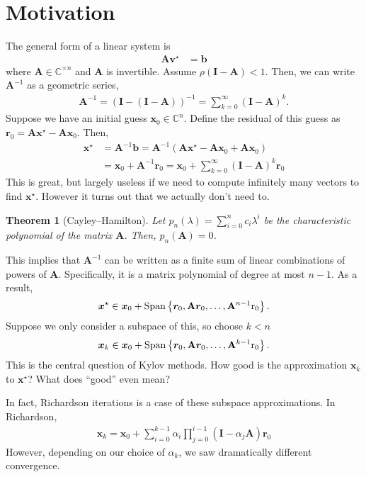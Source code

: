 \documentclass[12pt,a4paper]{article} %
\newtheorem*{theorem}{Theorem}
\DeclareMathOperator{\Span}{Span}
\begin{document}
\section{Motivation}
The general form of a linear system is 
\begin{align*}
    \mathbf A \bm v^\star &= \bm b
\end{align*}
where $\mathbf A \in \mathbb C^{ \times n}$ and $\mathbf A$ is invertible. 
Assume $\rho(\mathbf I - \mathbf A) < 1$. Then, we can write
$\mathbf A^{-1}$ as a geometric series,
\begin{align*}
    \mathbf A^{-1} = (\mathbf I - (\mathbf I - \mathbf A))^{-1} = \sum_{k=0}^\infty (\mathbf I-\mathbf A)^k.
\end{align*}
Suppose we have an initial guess $\bm x_0 \in \mathbb C^n$.
Define the residual of this guess as $\bm r_0 = \mathbf A \bm x^\star - \mathbf A \bm x_0$.
Then,
\begin{align*}
    \bm x^\star &= \mathbf A^{-1}\bm b = \mathbf A^{-1} 
    (\mathbf A \bm x^\star - \mathbf A \bm x_0 + \mathbf A \bm x_0) \\ 
    &= \bm x_0 + \mathbf A^{-1} \bm r_0 = \bm x_0 + \sum_{k=0}^\infty (\mathbf I-\mathbf A)^k \bm r_0
\end{align*}
This is great, but largely useless if we need to compute infinitely many vectors 
to find $\bm x^\star$. However it turns out that we actually don't need to.
\begin{theorem}[Cayley--Hamilton]
    Let $p_n(\lambda) = \sum_{i=0}^n c_i \lambda^i$ be the characteristic 
    polynomial of the matrix $\mathbf A$. Then, $p_n(\mathbf A) = 0$.
\end{theorem}
This implies that $\mathbf A^{-1}$ can be written as a finite sum of linear 
combinations of powers of $\mathbf A$. Specifically, it is a matrix polynomial 
of degree at most $n-1$. As a result, 
\begin{align*}
    \bm x^\star \in \bm x_0 + \Span \left\{ \bm r_0, \mathbf A \bm r_0, \ldots, \mathbf A^{n-1}\rm r_0\right\}.
\end{align*}
Suppose we only consider a subspace of this, so choose $k < n$
\begin{align*}
    \bm x_k \in \bm x_0 + \Span \left\{ \bm r_0, \mathbf A \bm r_0, \ldots, \mathbf A^{k-1}\rm r_0\right\}.
\end{align*}
This is the central question of Kylov methods. How good is the approximation $\bm x_k$ to 
$\bm x^\star$? What does ``good'' even mean?

In fact, Richardson iterations is a case of these subspace approximations. In Richardson, 
\begin{align*}
    \bm x_k = \bm x_0 + \sum_{i=0}^{k-1} \alpha_i \prod_{j=0}^{i-1} (\mathbf I - \alpha_j \mathbf A) \bm r_0
\end{align*}
However, depending on our choice of $\alpha_k$, we saw dramatically different convergence.
\end{document}
